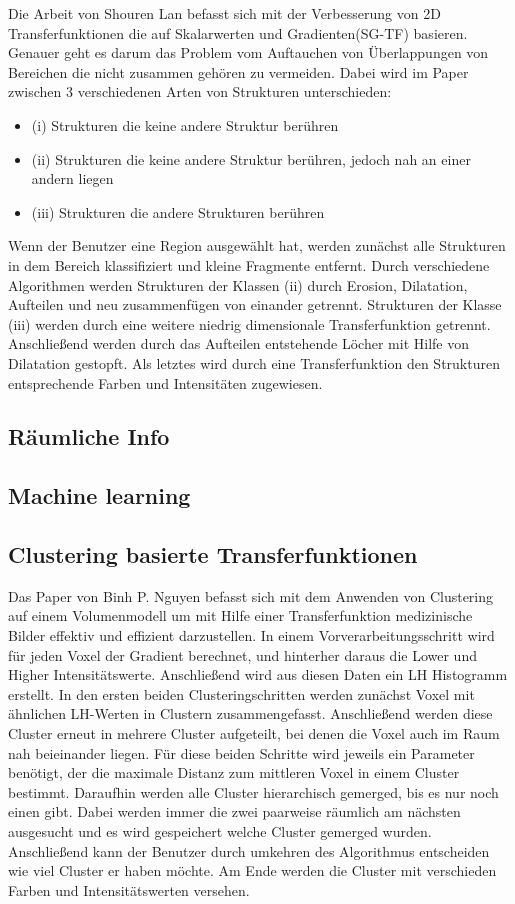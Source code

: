 Die Arbeit von Shouren Lan \cite{lan2017improving} befasst sich mit der Verbesserung von 2D Transferfunktionen die auf Skalarwerten und Gradienten(SG-TF) basieren. Genauer geht es darum das Problem vom Auftauchen von Überlappungen von Bereichen die nicht zusammen gehören zu vermeiden.
\newline
Dabei wird im Paper zwischen 3 verschiedenen Arten von Strukturen unterschieden:
\begin{itemize}
\item (i) Strukturen die keine andere Struktur berühren
\item (ii) Strukturen die keine andere Struktur berühren, jedoch nah an einer andern liegen
\item (iii) Strukturen die andere Strukturen berühren
\end{itemize} 
Wenn der Benutzer eine Region ausgewählt hat, werden zunächst alle Strukturen in dem Bereich klassifiziert und kleine Fragmente entfernt. Durch verschiedene Algorithmen werden Strukturen der Klassen (ii) durch Erosion, Dilatation, Aufteilen und neu zusammenfügen von einander getrennt. Strukturen der Klasse (iii) werden durch eine weitere niedrig dimensionale Transferfunktion getrennt. Anschließend werden durch das Aufteilen entstehende Löcher mit Hilfe von Dilatation gestopft. Als letztes wird durch eine Transferfunktion den Strukturen entsprechende Farben und Intensitäten zugewiesen.


\subsection{Räumliche Info}
\subsection{Machine learning}
\subsection{Clustering basierte Transferfunktionen}


Das Paper von Binh P. Nguyen \cite{nguyen2012clustering} befasst sich mit dem Anwenden von Clustering auf einem Volumenmodell um mit Hilfe einer Transferfunktion medizinische Bilder effektiv und effizient darzustellen.
In einem Vorverarbeitungsschritt wird für jeden Voxel der Gradient berechnet, und hinterher daraus die Lower und Higher Intensitätswerte. Anschließend wird aus diesen Daten ein LH Histogramm erstellt.
In den ersten beiden Clusteringschritten werden zunächst Voxel mit ähnlichen  LH-Werten in Clustern zusammengefasst. Anschließend werden diese Cluster erneut in mehrere Cluster aufgeteilt, bei denen die Voxel auch im Raum nah beieinander liegen. Für diese beiden Schritte wird jeweils ein Parameter benötigt, der die maximale Distanz zum mittleren Voxel in einem Cluster bestimmt. Daraufhin werden alle Cluster hierarchisch gemerged, bis es nur noch einen gibt. Dabei werden immer die zwei paarweise räumlich am nächsten ausgesucht und es wird gespeichert welche Cluster gemerged wurden. Anschließend kann der Benutzer durch umkehren des Algorithmus entscheiden wie viel Cluster er haben möchte. Am Ende werden die Cluster mit verschieden Farben und Intensitätswerten versehen.

